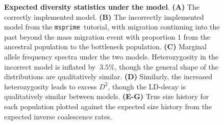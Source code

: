 \documentclass{article}
\newcommand{\msprime}[0]{\texttt{msprime}}
\begin{document}
\begin{figure}[ht]
\begin{center}
\caption{\textbf{Expected diversity statistics under the \citet{gutenkunst2009inferring} model}.
    \textbf{(A)} The correctly implemented model.
    \textbf{(B)} The incorrectly implemented model from the \msprime\ tutorial, with migration continuing
    into the past beyond the mass migration event with proportion $1$ from the ancestral population
    to the bottleneck population.
    \textbf{(C)} Marginal allele frequency spectra under the two models. Heterozygosity in the incorrect model
    is inflated by $~3.5\%$, though the general shape of the distributions are qualitatively similar.
    \textbf{(D)} Similarly, the increased heterozygosity leads to excess $D^2$, though the LD-decay is
    qualitatively similar between models.
    \textbf{(E-G)} True size history for each population plotted against the expected size history from
    the expected inverse coalescence rates.
}
\label{fig:ooa_stats}
\end{center}
\end{figure}
\end{document}
